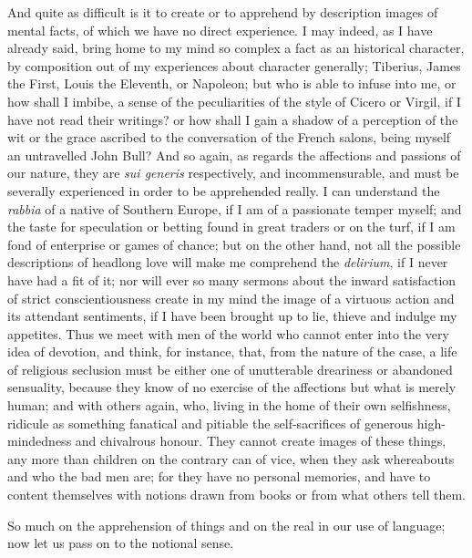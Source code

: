 And quite as difficult is it to create or to apprehend by
description images of mental facts, of which we have no direct
experience. I may indeed, as I have already said, bring home to my
mind so complex a fact as an historical character, by composition out
of my experiences about character generally; Tiberius, James the
First, Louis the Eleventh, or Napoleon; but who is able to infuse into
me, or how shall I imbibe, a sense of the peculiarities of the style
of Cicero or Virgil, if I have not read their writings? or how shall I
gain a shadow of a perception of the wit or the grace ascribed to the
conversation of the French salons, being myself an untravelled John
Bull? And so again, as regards the affections and passions of our
nature, they are \emph{sui generis} respectively, and incommensurable,
and must be severally experienced in order to be apprehended really. I
can understand the \emph{rabbia} of a native of Southern Europe, if I
am of a passionate temper myself; and the taste for speculation or
betting found in great traders or on the turf, if I am fond of
enterprise or games of chance; but on the other hand, not all the
possible descriptions of headlong love will make me comprehend the \emph{delirium},
if I never have had a fit of it; nor will ever so many sermons about
the inward satisfaction of strict conscientiousness create in my mind
the image of a virtuous action and its attendant sentiments, if I have
been brought up to lie, thieve and indulge my appetites. Thus we meet
with men of the world who cannot enter into the very idea of devotion,
and think, for instance, that, from the nature of the case, a life of
religious seclusion must be either one of unutterable dreariness or
abandoned sensuality, because they know of no exercise of the
affections but what is merely human; and with others again, who,
living in the home of their own selfishness, ridicule as something
fanatical and pitiable the self-sacrifices of generous high-mindedness
and chivalrous honour. They cannot create images of these things,
any more than children on the contrary can of vice, when they ask
whereabouts and who the bad men are; for they have no personal
memories, and have to content themselves with notions drawn from books
or from what others tell them.

So much on the apprehension of things and on the real in our use of
language; now let us pass on to the notional sense.

